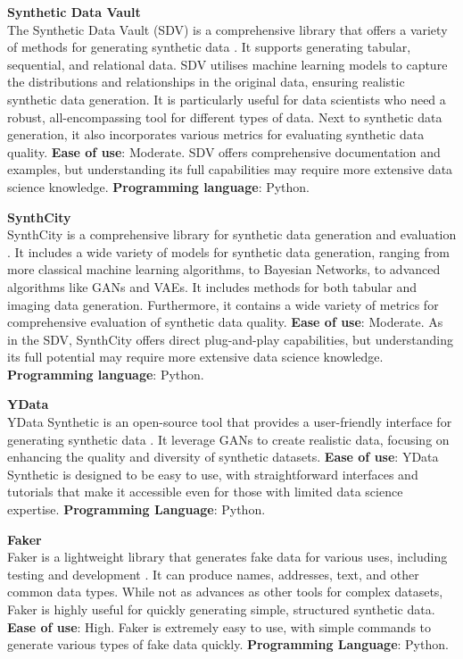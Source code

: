 \textbf{Synthetic Data Vault} \\
The Synthetic Data Vault (SDV) is a comprehensive library that offers a variety of methods for generating synthetic data \cite{patki2016synthetic}. It supports generating tabular, sequential, and relational data. SDV utilises machine learning models to capture the distributions and relationships in the original data, ensuring realistic synthetic data generation. It is particularly useful for data scientists who need a robust, all-encompassing tool for different types of data. Next to synthetic data generation, it also incorporates various metrics for evaluating synthetic data quality. \textbf{Ease of use}: Moderate. SDV offers comprehensive documentation and examples, but understanding its full capabilities may require more extensive data science knowledge. \textbf{Programming language}: Python. 

\textbf{SynthCity} \\
SynthCity is a comprehensive library for synthetic data generation and evaluation \cite{qian2024synthcity}. It includes a wide variety of models for synthetic data generation, ranging from more classical machine learning algorithms, to Bayesian Networks, to advanced algorithms like GANs and VAEs. It includes methods for both tabular and imaging data generation. Furthermore, it contains a wide variety of metrics for comprehensive evaluation of synthetic data quality. \textbf{Ease of use}: Moderate. As in the SDV, SynthCity offers direct plug-and-play capabilities, but understanding its full potential may require more extensive data science knowledge. \textbf{Programming language}: Python. 

\textbf{YData} \\
YData Synthetic is an open-source tool that provides a user-friendly interface for generating synthetic data \cite{ydata}. It leverage GANs to create realistic data, focusing on enhancing the quality and diversity of synthetic datasets. \textbf{Ease of use}: YData Synthetic is designed to be easy to use, with straightforward interfaces and tutorials that make it accessible even for those with limited data science expertise. \textbf{Programming Language}: Python.

\textbf{Faker}\\
Faker is a lightweight library that generates fake data for various uses, including testing and development \cite{faker}. It can produce names, addresses, text, and other common data types. While not as advances as other tools for complex datasets, Faker is highly useful for quickly generating simple, structured synthetic data. \textbf{Ease of use}: High. Faker is extremely easy to use, with simple commands to generate various types of fake data quickly. \textbf{Programming Language}: Python. 

